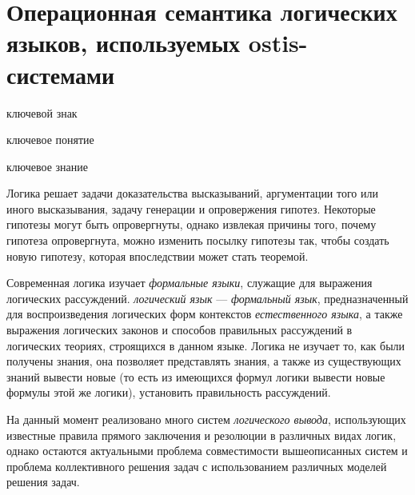 \section{Операционная семантика логических языков, используемых ostis-системами}
\label{logic_lang_os}

\begin{SCn}
	\begin{scnrelfromlist}{ключевой знак}
	\end{scnrelfromlist}
\end{SCn}

\begin{SCn}
	\begin{scnrelfromlist}{ключевое понятие}
	\end{scnrelfromlist}
\end{SCn}

\begin{SCn}
	\begin{scnrelfromlist}{ключевое знание}
	\end{scnrelfromlist}
\end{SCn}

\bigskip

Логика решает задачи доказательства высказываний, аргументации того или иного высказывания, задачу генерации и опровержения гипотез. Некоторые гипотезы могут быть опровергнуты, однако извлекая причины того, почему гипотеза опровергнута, можно изменить посылку гипотезы так, чтобы создать новую гипотезу, которая впоследствии может стать теоремой.

Современная логика изучает \textit{формальные языки}, служащие для выражения логических рассуждений. \textit{логический язык} — \textit{формальный язык}, предназначенный для воспроизведения логических форм контекстов \textit{естественного языка}, а также выражения логических законов и способов правильных рассуждений в логических теориях, строящихся в данном языке. Логика не изучает то, как были получены знания, она позволяет представлять знания, а также из существующих знаний вывести новые (то есть из имеющихся формул логики вывести новые формулы этой же логики), установить правильность рассуждений.

На данный момент реализовано много систем \textit{логического вывода}, использующих известные правила прямого заключения и резолюции в различных видах логик, однако остаются актуальными проблема совместимости вышеописанных систем и проблема коллективного решения задач с использованием различных моделей решения задач.

